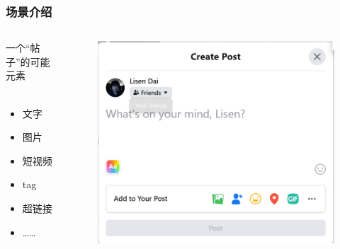 \documentclass[../Postbot.tex]{subfiles}
\begin{document}
    \begin{frame}
        \frametitle{场景介绍}
        \begin{columns}
            \begin{column}{.3\linewidth}
                {\large 一个“帖子”的可能元素} \\
                \hspace*{\fill} \\
                \begin{itemize}
                    \item 文字
                    \item 图片
                    \item 短视频
                    \item tag
                    \item 超链接
                    \item ……
                \end{itemize}

            \end{column}

            \begin{column}{.5\linewidth}
                
                \begin{figure}[h]
                    \centering
                    \includegraphics[scale=0.24]{../src/img/Facebook.png} \\
                \end{figure}


\end{column}
\end{columns}
\end{frame}
\end{document}
